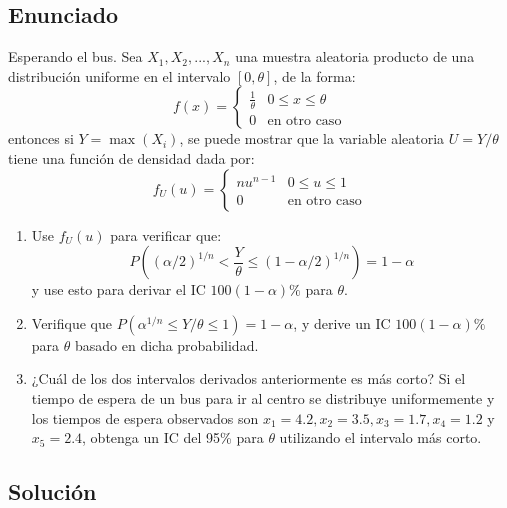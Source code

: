 \documentclass[12pt]{article}
\begin{document}
\subsection{Enunciado}
Esperando el bus. Sea $X_1, X_2, ..., X_n$ una muestra aleatoria producto de una distribución uniforme en el intervalo $[0, \theta]$, de la forma:
$$
f(x) = \begin{cases} \frac{1}{\theta} & 0 \le x \le \theta \\ 0 & \text{en otro caso} \end{cases}
$$
entonces si $Y = \max(X_i)$, se puede mostrar que la variable aleatoria $U = Y/\theta$ tiene una función de densidad dada por:
$$
f_U(u) = \begin{cases} nu^{n-1} & 0 \le u \le 1 \\ 0 & \text{en otro caso} \end{cases}
$$
\begin{enumerate}
    \item[a)] Use $f_U(u)$ para verificar que:
    $$ P\left( (\alpha/2)^{1/n} < \frac{Y}{\theta} \le (1 - \alpha/2)^{1/n} \right) = 1 - \alpha $$
    y use esto para derivar el IC $100(1-\alpha)\%$ para $\theta$.
    \item[b)] Verifique que $P(\alpha^{1/n} \le Y/\theta \le 1) = 1 - \alpha$, y derive un IC $100(1-\alpha)\%$ para $\theta$ basado en dicha probabilidad.
    \item[c)] ¿Cuál de los dos intervalos derivados anteriormente es más corto? Si el tiempo de espera de un bus para ir al centro se distribuye uniformemente y los tiempos de espera observados son $x_1 = 4.2, x_2 = 3.5, x_3 = 1.7, x_4 = 1.2$ y $x_5 = 2.4$, obtenga un IC del 95\% para $\theta$ utilizando el intervalo más corto.
\end{enumerate}

\subsection{Solución}
\end{document}
